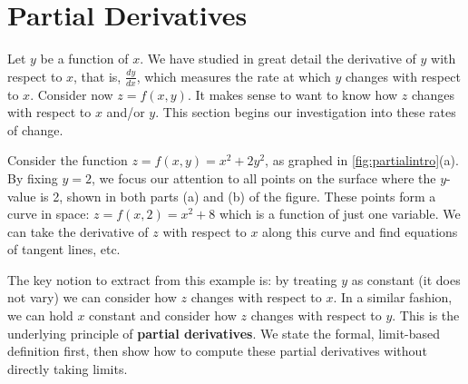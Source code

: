 \section{Partial Derivatives}\label{sec:partial_derivatives}

Let $y$ be a function of $x$. We have studied in great detail the derivative of $y$ with respect to $x$, that is, $\frac{dy}{dx}$, which measures the rate at which $y$ changes with respect to $x$. Consider now $z=f(x,y)$. It makes sense to want to know how $z$ changes with respect to $x$ and/or $y$. This section begins our investigation into these rates of change.


Consider the function $z=f(x,y) = x^2+2y^2$, as graphed in \autoref{fig:partialintro}(a). By fixing $y=2$, we focus our attention to all points on the surface where the $y$-value is 2, shown in both parts (a) and (b) of the figure. These points form a curve in space: $z = f(x,2) = x^2+8$ which is a function of just one variable. We can take the derivative of $z$ with respect to $x$ along this curve and find equations of tangent lines, etc.

The key notion to extract from this example is: by treating $y$ as  constant (it does not vary) we can consider how $z$ changes with respect to $x$. In a similar fashion, we can hold $x$ constant and consider how $z$ changes with respect to $y$. This is the underlying principle of \textbf{partial derivatives}. We state the formal, limit-based definition first, then show how to compute these partial derivatives without directly taking limits.


